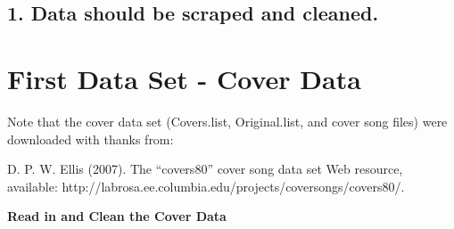 \documentclass[11pt]{article}
\begin{document}
    \hypertarget{data-should-be-scraped-and-cleaned.}{%
\subsection{\texorpdfstring{\textbf{1. Data should be scraped and
cleaned.}}{1. Data should be scraped and cleaned.}}\label{data-should-be-scraped-and-cleaned.}}

    \hypertarget{first-data-set---cover-data}{%
\section{First Data Set - Cover
Data}\label{first-data-set---cover-data}}

    Note that the cover data set (Covers.list, Original.list, and cover song
files) were downloaded with thanks from:

D. P. W. Ellis (2007). The ``covers80'' cover song data set Web
resource, available:
http://labrosa.ee.columbia.edu/projects/coversongs/covers80/.

    \textbf{Read in and Clean the Cover Data}
\end{document}
